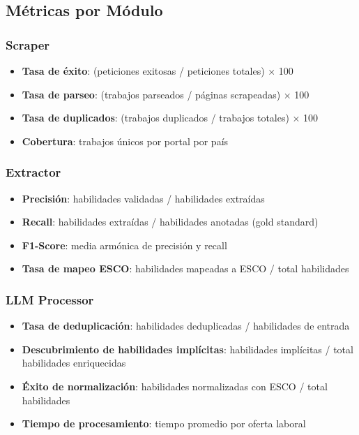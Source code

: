 \subsection{Métricas por Módulo}

\subsubsection{Scraper}
\begin{itemize}
    \item \textbf{Tasa de éxito}: (peticiones exitosas / peticiones totales) × 100
    \item \textbf{Tasa de parseo}: (trabajos parseados / páginas scrapeadas) × 100
    \item \textbf{Tasa de duplicados}: (trabajos duplicados / trabajos totales) × 100
    \item \textbf{Cobertura}: trabajos únicos por portal por país
\end{itemize}

\subsubsection{Extractor}
\begin{itemize}
    \item \textbf{Precisión}: habilidades validadas / habilidades extraídas
    \item \textbf{Recall}: habilidades extraídas / habilidades anotadas (gold standard)
    \item \textbf{F1-Score}: media armónica de precisión y recall
    \item \textbf{Tasa de mapeo ESCO}: habilidades mapeadas a ESCO / total habilidades
\end{itemize}

\subsubsection{LLM Processor}
\begin{itemize}
    \item \textbf{Tasa de deduplicación}: habilidades deduplicadas / habilidades de entrada
    \item \textbf{Descubrimiento de habilidades implícitas}: habilidades implícitas / total habilidades enriquecidas
    \item \textbf{Éxito de normalización}: habilidades normalizadas con ESCO / total habilidades
    \item \textbf{Tiempo de procesamiento}: tiempo promedio por oferta laboral
\end{itemize}

